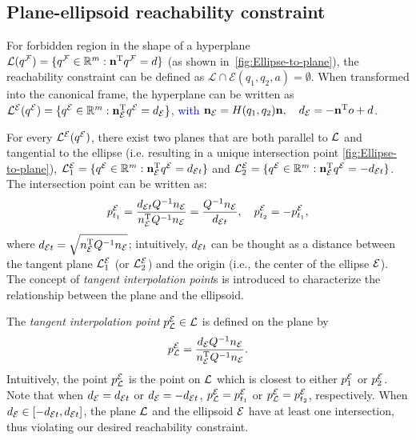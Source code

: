 \documentclass[10pt,twocolumn,twoside]{IEEEtran}
\newcommand{\new}[1]{\textcolor{blue}{#1}}
\begin{document}
\subsection{Plane-ellipsoid reachability constraint}\label{sec:ellipsoide-plane}

For forbidden region in the shape of a hyperplane $\mathcal{L}({q^{\mathcal{F}}}) = \{{q^{\mathcal{F}}}\in\mathbb{R}^m: \mathbf{n}^\mathrm{T} {q^{\mathcal{F}}} = d\}$ (as shown in~\cref{fig:Ellipse-to-plane}), the reachability constraint can be defined as $\mathcal{L} \cap \mathcal{E}(q_1,q_2,a) = \emptyset$. When transformed into the canonical frame, the hyperplane can be written as ${\mathcal{L}^{\mathcal{E}}}({q^{\mathcal{E}}}) = \{  {q^{\mathcal{E}}}\in\mathbb{R}^m:  \mathbf{n}_{\mathcal{E}}^\mathrm{T} {q^{\mathcal{E}}} = d_{\mathcal{E}}\}$, \new{with $\mathbf{n}_{\mathcal{E}} = H(q_1,q_2)\mathbf{n}, \quad d_{\mathcal{E}} =-\mathbf{n}^\mathrm{T} o + d$.}

For every ${\mathcal{L}^{\mathcal{E}}}({q^{\mathcal{E}}})$, there exist two planes that are both parallel to $\mathcal{L}$ and tangential to the ellipse (i.e. resulting in a unique intersection point \cref{fig:Ellipse-to-plane}), $\mathcal{L}_1^{\mathcal{E}} = \{{q^{\mathcal{E}}}\in\mathbb{R}^m: \mathbf{n}_{\mathcal{E}} ^\mathrm{T} {q^{\mathcal{E}}} =  d_{\mathcal{E} t} \}$ and $\mathcal{L}_2^{\mathcal{E}} = \{{q^{\mathcal{E}}}\in\mathbb{R}^m: \mathbf{n}_{\mathcal{E}} ^\mathrm{T} {q^{\mathcal{E}}} = - d_{\mathcal{E} t} \}$. The intersection point can be written as:
\begin{equation}
    p^{\mathcal{E}}_{t_{1}} = \frac{ d_{\mathcal{E} t} Q^{-1}   n_{\mathcal{E}}}{ n_{\mathcal{E}} ^\mathrm{T} Q^{-1}  n_{\mathcal{E}}} = \frac{Q^{-1} n_{\mathcal{E}}}{ d_{\mathcal{E} t}},\quad  p^{\mathcal{E}}_{t_{2}} = -  p^{\mathcal{E}}_{t_{1}},
\end{equation}
where $d_{\mathcal{E} t} = \sqrt{ n_{\mathcal{E}}^\mathrm{T} Q^{-1} n_{\mathcal{E}}}$; intuitively, $d_{\mathcal{E} t}$ can be thought as a distance between the tangent plane $\mathcal{L}_1^{\mathcal{E}}$ (or $\mathcal{L}_2^{\mathcal{E}}$) and the origin (i.e., the center of the ellipse $\mathcal{E}$). The concept of \emph{tangent interpolation point}s is introduced to characterize the relationship between the plane and the ellipsoid.

\begin{definition}
The \emph{tangent interpolation point} $p^{\mathcal{E}}_{\mathcal{L}} \in \mathcal{L}$ is defined on the plane by 
    \begin{equation}\label{equ:ProjectPoint}
      p^{\mathcal{E}}_{\mathcal{L}} = \frac{ d_{\mathcal{E}} Q^{-1} n_{\mathcal{E}}}{ n_{\mathcal{E}}^\mathrm{T} Q^{-1} n_{\mathcal{E}}}.
    \end{equation}
  Intuitively, the point $p^{\mathcal{E}}_{\mathcal{L}}$ is the point on $\mathcal{L}$ which is closest to either $p^{\mathcal{E}}_1$ or $p^{\mathcal{E}}_2$.
  Note that when  $d_{\mathcal{E}}=d_{\mathcal{E} t}$ or $d_{\mathcal{E}}=-d_{\mathcal{E} t}$, $p^{\mathcal{E}}_{\mathcal{L}}=p^{\mathcal{E}}_{t_1}$ or $p^{\mathcal{E}}_{\mathcal{L}}=p^{\mathcal{E}}_{t_2}$, respectively. When $ d_{\mathcal{E}} \in [- d_{\mathcal{E} t},  d_{\mathcal{E} t}]$, the plane $\mathcal{L}$ and the ellipsoid $\mathcal{E}$ have at least one intersection, thus violating our desired reachability constraint. 
\end{definition}
\end{document}
